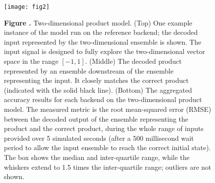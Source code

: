 \documentclass{frontiersSCNS}
\begin{document}
\begin{figure}[!ht]
\begin{center}
  \texttt{[image: fig2]}
\end{center}
\textbf{\label{fig:02} Figure .}
       {Two-dimensional product model. (Top) One example instance of the model
         run on the reference backend; the decoded input represented
         by the two-dimensional ensemble is shown. The input signal is
         designed to fully explore the two-dimensional vector space
         in the range $[-1, 1]$.
         (Middle) The decoded product represented by an ensemble downstream
         of the ensemble representing the input. It closely matches the
         correct product (indicated with the solid black line).
         (Bottom) The aggregated accuracy results for each backend on the
         two-dimensional product model. The measured metric is the root
         mean-squared error (RMSE) between the decoded output of the ensemble
         representing the product and the correct product, during the whole
         range of inputs provided over 5 simulated seconds (after a 500
         millisecond wait period to allow the input ensemble to reach the
         correct initial state). The box shows the median and
         inter-quartile range, while the whiskers extend to 1.5 times the
         inter-quartile range; outliers are not shown.}
\end{figure}


\end{document}
